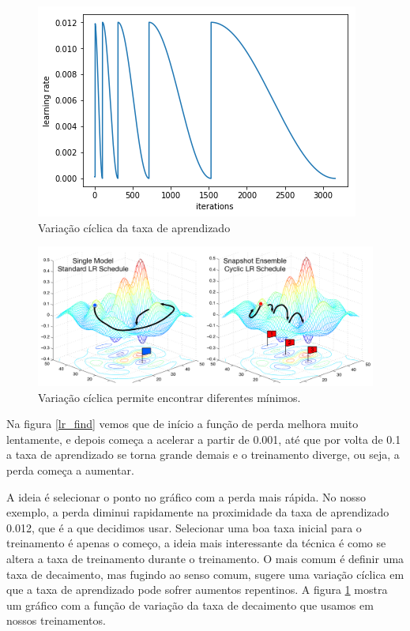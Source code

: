 \documentclass[conference]{IEEEtran}
\begin{document}
\begin{figure}[ht!]
\begin{center}
\includegraphics[width=.55\columnwidth]{cyclical_graph.png}
\caption{Variação cíclica da taxa de aprendizado}
\label{cycle}
\end{center}
\end{figure}

\begin{figure}[ht!]
\begin{center}
\includegraphics[width=\columnwidth]{minimos.png}
\caption{Variação cíclica permite encontrar diferentes mínimos\cite{cyclical}.}
\label{minimos}
\end{center}
\end{figure}

Na figura \ref{lr_find} vemos que de início a função de perda melhora muito lentamente, e depois começa a acelerar a partir de 0.001, até que por volta de 0.1 a taxa de aprendizado se torna grande demais e o treinamento diverge, ou seja, a perda começa a aumentar. 

A ideia é selecionar o ponto no gráfico com a perda mais rápida. No nosso exemplo, a perda diminui rapidamente na proximidade da taxa de aprendizado 0.012, que é a que decidimos usar. Selecionar uma boa taxa inicial para o treinamento é apenas o começo, a ideia mais interessante da técnica é como se altera a taxa de treinamento durante o treinamento.  O mais comum é definir uma taxa de decaimento, mas fugindo ao senso comum,\cite{cyclical} sugere uma variação cíclica em que a taxa de aprendizado pode sofrer aumentos repentinos. A figura \ref{cycle} mostra um gráfico com a função de variação da taxa de decaimento que usamos em nossos treinamentos.
\end{document}
